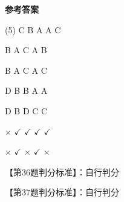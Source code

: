 \documentclass[11pt, a4paper]{article}
\begin{document}
\begin{center}
    \Huge \textbf{参考答案}
\end{center}

    \begin{tasks}[label=\arabic*. , label-width=14pt](5)
        \task C
        \task B
        \task A
        \task A
        \task C

        \task B
        \task A
        \task C
        \task A
        \task B

        \task B
        \task A
        \task C
        \task A
        \task C

        \task D
        \task B
        \task B
        \task A
        \task A

        \task D
        \task B
        \task D
        \task C
        \task C

        \task $\times$
        \task $\checkmark$
        \task $\checkmark$
        \task $\checkmark$
        \task $\checkmark$

        \task $\times$
        \task $\checkmark$
        \task $\times$
        \task $\checkmark$
        \task $\times$
    \end{tasks}

    【第36题判分标准】：自行判分

    【第37题判分标准】：自行判分
\end{document}
